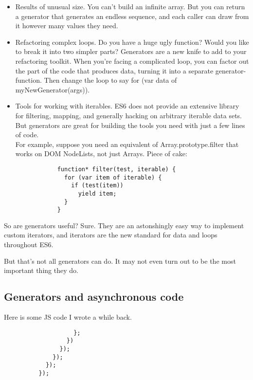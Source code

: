         \begin{itemize}
          \item Results of unusual size. You can't build an infinite array. But you can return a generator that generates an endless sequence, and each caller can draw from it however many values they need.
          \item Refactoring complex loops. Do you have a huge ugly function? Would you like to break it into two simpler parts? Generators are a new knife to add to your refactoring toolkit. When you're facing a complicated loop, you can factor out the part of the code that produces data, turning it into a separate generator-function. Then change the loop to say for (var data of myNewGenerator(args)).
          \item Tools for working with iterables. ES6 does not provide an extensive library for filtering, mapping, and generally hacking on arbitrary iterable data sets. But generators are great for building the tools you need with just a few lines of code. \\
          For example, suppose you need an equivalent of Array.prototype.filter that works on DOM NodeLists, not just Arrays. Piece of cake:\\
          \begin{lstlisting}
            function* filter(test, iterable) {
              for (var item of iterable) {
                if (test(item))
                  yield item;
              }
            }
          \end{lstlisting}
        \end{itemize}

        So are generators useful? Sure. They are an astonshingly easy way to implement custom iterators, and iterators are the new standard for data and loops throughout ES6.

        But that's not all generators can do. It may not even turn out to be the most important thing they do.

    \subsection{Generators and asynchronous code}
      \label{subsec:generators_and_asynchronous_code}
        Here is some JS code I wrote a while back.

        \begin{lstlisting}
                    };
                  })
                });
              });
            });
          });
        \end{lstlisting}

